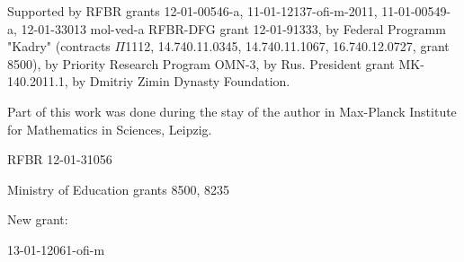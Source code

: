 Supported by RFBR grants 12-01-00546-a, 11-01-12137-ofi-m-2011, 11-01-00549-a, 12-01-33013 mol-ved-a 
RFBR-DFG grant 12-01-91333, by Federal Programm "Kadry" (contracts $\Pi$1112, 14.740.11.0345, 14.740.11.1067, 16.740.12.0727,
grant 8500),  by Priority Research Program OMN-3,                                                                                                                                                                                                                         %
by Rus. President grant MK-140.2011.1, by Dmitriy Zimin Dynasty
Foundation. %

Part of this work was done during the stay of the author
in Max-Planck Institute for Mathematics in Sciences, Leipzig. %

RFBR 12-01-31056 %

Ministry of Education grants 8500, 8235 

New grant:

13-01-12061-ofi-m

